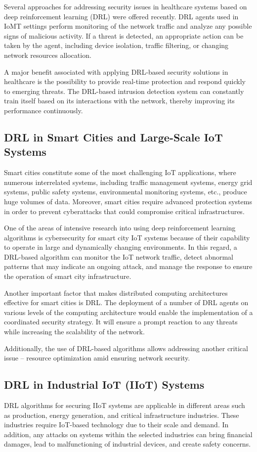 \documentclass[12pt]{article}
\begin{document}
Several approaches for addressing security issues in healthcare systems based on deep reinforcement learning (DRL) were offered recently. DRL agents used in IoMT settings perform monitoring of the network traffic and analyze any possible signs of malicious activity. If a threat is detected, an appropriate action can be taken by the agent, including device isolation, traffic filtering, or changing network resources allocation.

A major benefit associated with applying DRL-based security solutions in healthcare is the possibility to provide real-time protection and respond quickly to emerging threats. The DRL-based intrusion detection system can constantly train itself based on its interactions with the network, thereby improving its performance continuously.
\subsection{DRL in Smart Cities and Large-Scale IoT Systems}
	Smart cities constitute some of the most challenging IoT applications, where numerous interrelated systems, including traffic management systems, energy grid systems, public safety systems, environmental monitoring systems, etc., produce huge volumes of data. Moreover, smart cities require advanced protection systems in order to prevent cyberattacks that could compromise critical infrastructures.

One of the areas of intensive research into using deep reinforcement learning algorithms is cybersecurity for smart city IoT systems because of their capability to operate in large and dynamically changing environments. In this regard, a DRL-based algorithm can monitor the IoT network traffic, detect abnormal patterns that may indicate an ongoing attack, and manage the response to ensure the operation of smart city infrastructure.

Another important factor that makes distributed computing architectures effective for smart cities is DRL. The deployment of a number of DRL agents on various levels of the computing architecture would enable the implementation of a coordinated security strategy. It will ensure a prompt reaction to any threats while increasing the scalability of the network.

Additionally, the use of DRL-based algorithms allows addressing another critical issue – resource optimization amid ensuring network security.
\subsection{DRL in Industrial IoT (IIoT) Systems}\cite{Devi}
DRL algorithms for securing IIoT systems are applicable in different areas such as production, energy generation, and critical infrastructure industries. These industries require IoT-based technology due to their scale and demand. In addition, any attacks on systems within the selected industries can bring financial damages, lead to malfunctioning of industrial devices, and create safety concerns.
\end{document}
